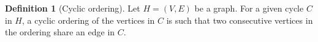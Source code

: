 \documentclass[10pt,a4paper]{article}
\newcommand{\prettyref}[1]{\cref{#1}}
\theoremstyle{definition}
\newtheorem{definition}[theorem]{Definition}
\theoremstyle{remark}
\newtheorem{claim}[theorem]{Claim}
\newcommand{\Authornotecolored}[3]{{\sffamily\small\color{#1}{[#2: #3]}}}
\newcommand{\Authornotecolored}[3]{}
\newcommand{\Ynote}{\Authornotecolored{Purple}{Y}}
\newcommand{\Snote}{\Authornotecolored{Green}{S}}
\newcommand{\snote}{\Snote}
\newcommand\sett[2]{\left\{ #1 \left| \; \vphantom{#1 #2} \right. #2  \right\}}
\numberwithin{equation}{section}
\let\pref=\prettyref
\begin{document}
\begin{definition}[Cyclic ordering]
    Let $H = (V,E)$ be a graph. 
    For a given cycle \(C\) in $H$, a cyclic ordering of the vertices in $C$ is such that two consecutive vertices in the ordering share an edge in $C$.
\end{definition}



\end{document}
